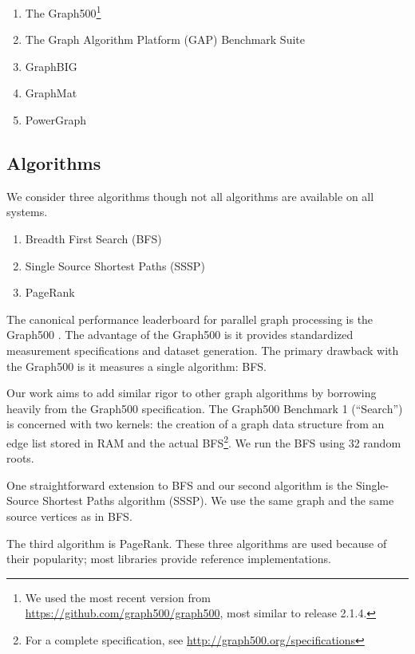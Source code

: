 \documentclass{llncs}
\begin{document}
\begin{enumerate}
	\item The Graph500\footnote{We used the most recent version from \url{https://github.com/graph500/graph500}, most similar to release 2.1.4.} \cite{Murphy:2010:Graph500}
	\item The Graph Algorithm Platform (GAP) Benchmark Suite \cite{Beamer:2015:GAPBench}
	\item GraphBIG \cite{Nai:2015:Graphbig}
	\item GraphMat \cite{Sundaram:2015:GraphMat}
	\item PowerGraph \cite{Gonzalez:2012:Powergraph}
\end{enumerate}

\subsection{Algorithms}

We consider three algorithms though not all algorithms are available on all systems.

\begin{enumerate}
	\item Breadth First Search (BFS)
	\item Single Source Shortest Paths (SSSP)
	\item PageRank
\end{enumerate}

The canonical performance leaderboard for parallel graph processing is the Graph500 \cite{Murphy:2010:Graph500}. The advantage of the Graph500 is it provides standardized measurement specifications and dataset generation. The primary drawback with the Graph500 is it measures a single algorithm: BFS.

Our work aims to add similar rigor to other graph algorithms by borrowing heavily from the Graph500 specification. The Graph500 Benchmark 1 (``Search'') is concerned with two kernels: the creation of a graph data structure from an edge list stored in RAM and the actual BFS\footnote{For a complete specification, see \url{http://graph500.org/specifications}}. We run the BFS using 32 random roots.

One straightforward extension to BFS and our second algorithm is the Single-Source Shortest Paths algorithm (SSSP). We use the same graph and the same source vertices as in BFS.

The third algorithm is PageRank. These three algorithms are used because of their popularity; most libraries provide reference implementations.
\end{document}
